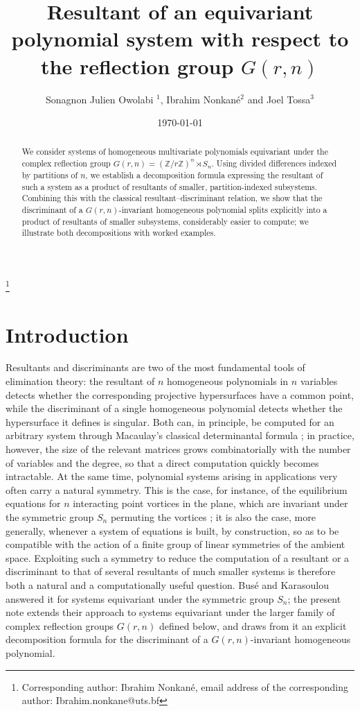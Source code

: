 \documentclass[12pt]{amsart}
\title[Resultant of an equivariant system for $G(r,n)$]
{Resultant of an equivariant polynomial system with respect to the reflection group $G(r,n)$}
\author{Sonagnon Julien Owolabi $^1$, Ibrahim Nonkan\'{e}$^2$ and
Joel Tossa$^3$ }
\date{\today}
\theoremstyle{definition}
\begin{document}
\begin{abstract}
We consider systems of homogeneous multivariate polynomials equivariant under the complex reflection group $G(r,n) = (\mathbb{Z}/r\mathbb{Z})^n \rtimes S_n$. Using divided differences indexed by partitions of $n$, we establish a decomposition formula expressing the resultant of such a system as a product of resultants of smaller, partition-indexed subsystems. Combining this with the classical resultant--discriminant relation, we show that the discriminant of a $G(r,n)$-invariant homogeneous polynomial splits explicitly into a product of resultants of smaller subsystems, considerably easier to compute; we illustrate both decompositions with worked examples.
\end{abstract}


\maketitle
\footnote{Corresponding author: Ibrahim Nonkan\'{e}, email address of the corresponding author: Ibrahim.nonkane@uts.bf} 
\section{Introduction}

Resultants and discriminants are two of the most fundamental tools of elimination theory: the resultant of $n$ homogeneous polynomials in $n$ variables detects whether the corresponding projective hypersurfaces have a common point, while the discriminant of a single homogeneous polynomial detects whether the hypersurface it defines is singular. Both can, in principle, be computed for an arbitrary system through Macaulay's classical determinantal formula \citep{Macaulay1902}; in practice, however, the size of the relevant matrices grows combinatorially with the number of variables and the degree, so that a direct computation quickly becomes intractable. At the same time, polynomial systems arising in applications very often carry a natural symmetry. This is the case, for instance, of the equilibrium equations for $n$ interacting point vortices in the plane, which are invariant under the symmetric group $S_n$ permuting the vortices \citep{FaugereSvartz2012}; it is also the case, more generally, whenever a system of equations is built, by construction, so as to be compatible with the action of a finite group of linear symmetries of the ambient space. Exploiting such a symmetry to reduce the computation of a resultant or a discriminant to that of several resultants of much smaller systems is therefore both a natural and a computationally useful question. Bus\'e and Karasoulou \citep{BuseKarasoulou2016} answered it for systems equivariant under the symmetric group $S_n$; the present note extends their approach to systems equivariant under the larger family of complex reflection groups $G(r,n)$ defined below, and draws from it an explicit decomposition formula for the discriminant of a $G(r,n)$-invariant homogeneous polynomial.
\end{document}
